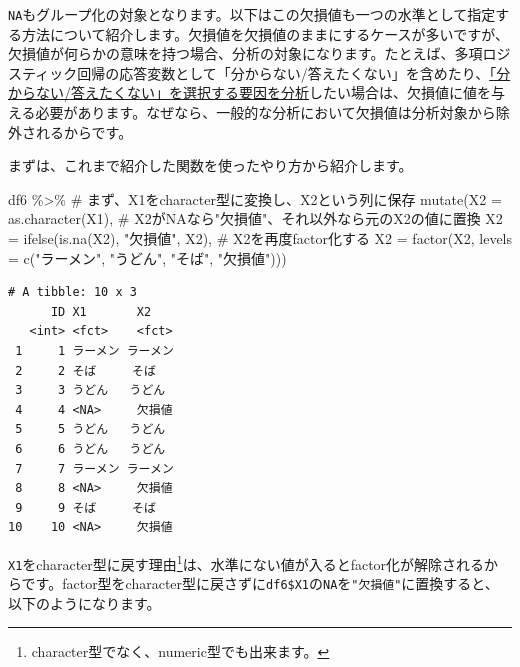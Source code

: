 \documentclass[
  a4paper,
  pandoc,
  ja=standard,
  jafont=haranoaji]{bxjsbook}
\newenvironment{Shaded}{\begin{snugshade}}{\end{snugshade}}
\newcommand{\AttributeTok}[1]{\textcolor[rgb]{0.00,0.48,0.65}{#1}}
\newcommand{\CommentTok}[1]{\textcolor[rgb]{0.37,0.37,0.37}{#1}}
\newcommand{\FunctionTok}[1]{\textcolor[rgb]{0.28,0.35,0.67}{#1}}
\newcommand{\NormalTok}[1]{\textcolor[rgb]{0.00,0.48,0.65}{#1}}
\newcommand{\SpecialCharTok}[1]{\textcolor[rgb]{0.37,0.37,0.37}{#1}}
\newcommand{\StringTok}[1]{\textcolor[rgb]{0.13,0.47,0.30}{#1}}
\begin{document}
\texttt{NA}もグループ化の対象となります。以下はこの欠損値も一つの水準として指定する方法について紹介します。欠損値を欠損値のままにするケースが多いですが、欠損値が何らかの意味を持つ場合、分析の対象になります。たとえば、多項ロジスティック回帰の応答変数として「分からない/答えたくない」を含めたり、\href{https://ci.nii.ac.jp/naid/40021269699}{「分からない/答えたくない」を選択する要因を分析}したい場合は、欠損値に値を与える必要があります。なぜなら、一般的な分析において欠損値は分析対象から除外されるからです。

まずは、これまで紹介した関数を使ったやり方から紹介します。

\begin{Shaded}
\begin{Highlighting}[numbers=left,,]
\NormalTok{df6 }\SpecialCharTok{\%\textgreater{}\%}
         \CommentTok{\# まず、X1をcharacter型に変換し、X2という列に保存}
  \FunctionTok{mutate}\NormalTok{(}\AttributeTok{X2 =} \FunctionTok{as.character}\NormalTok{(X1),}
         \CommentTok{\# X2がNAなら"欠損値"、それ以外なら元のX2の値に置換}
         \AttributeTok{X2 =} \FunctionTok{ifelse}\NormalTok{(}\FunctionTok{is.na}\NormalTok{(X2), }\StringTok{"欠損値"}\NormalTok{, X2),}
         \CommentTok{\# X2を再度factor化する}
         \AttributeTok{X2 =} \FunctionTok{factor}\NormalTok{(X2, }
                     \AttributeTok{levels =} \FunctionTok{c}\NormalTok{(}\StringTok{"ラーメン"}\NormalTok{, }\StringTok{"うどん"}\NormalTok{, }\StringTok{"そば"}\NormalTok{, }\StringTok{"欠損値"}\NormalTok{)))}
\end{Highlighting}
\end{Shaded}

\begin{verbatim}
# A tibble: 10 x 3
      ID X1       X2      
   <int> <fct>    <fct>   
 1     1 ラーメン ラーメン
 2     2 そば     そば    
 3     3 うどん   うどん  
 4     4 <NA>     欠損値  
 5     5 うどん   うどん  
 6     6 うどん   うどん  
 7     7 ラーメン ラーメン
 8     8 <NA>     欠損値  
 9     9 そば     そば    
10    10 <NA>     欠損値  
\end{verbatim}

\texttt{X1}をcharacter型に戻す理由\footnote{character型でなく、numeric型でも出来ます。}は、水準にない値が入るとfactor化が解除されるからです。factor型をcharacter型に戻さずに\texttt{df6\$X1}の\texttt{NA}を\texttt{"欠損値"}に置換すると、以下のようになります。

\begin{Shaded}
\end{Shaded}
\end{document}
